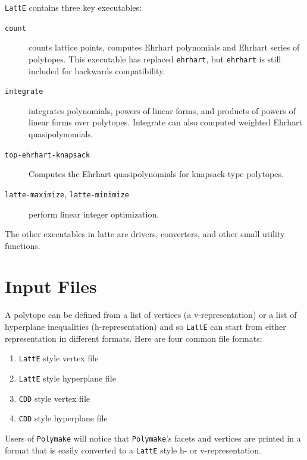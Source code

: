 \documentclass{article}
\newcommand{\latte}{{\tt LattE}\xspace}
\newcommand{\cdd}{{\tt CDD}\xspace}
\begin{document}
\latte contains three key executables:
\begin{description}
        \item[\texttt{count}] counts lattice points, computes Ehrhart polynomials and Ehrhart series of polytopes. This executable has replaced {\tt ehrhart}, but {\tt ehrhart} is still included for backwards compatibility.
        \item[\texttt{integrate}] integrates polynomials, powers of linear forms, and products of powers of linear forms over polytopes. Integrate can also computed weighted Ehrhart quasipolynomials.
        \item[\texttt{top-ehrhart-knapsack}] Computes the Ehrhart quasipolynomials for knapsack-type polytopes.
        \item[\texttt{latte-maximize}, \texttt{latte-minimize}] perform linear integer optimization.
\end{description}

The other executables in latte are drivers, converters, and other small utility functions.


\section{Input Files}\label{Input Files}

A polytope can be defined from a list of vertices (a v-representation) or a list of hyperplane inequalities (h-representation) and so \latte can start from either representation in different formats. Here are four common file formats:
\begin{enumerate}
        \item \latte style vertex file
        \item \latte style hyperplane file
        \item \cdd style vertex file
        \item \cdd style hyperplane file
\end{enumerate}

Users of {\tt Polymake} will notice that {\tt Polymake}'s facets and vertices are printed in a format that is easily converted to a \latte style h- or v-representation.
\end{document}
